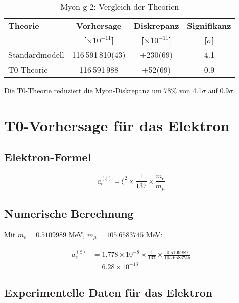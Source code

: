 \documentclass[12pt,a4paper]{article}
\newcommand{\xipar}{\xi}
\begin{document}
	\begin{table}[H]
		\centering
		\caption{Myon g-2: Vergleich der Theorien}
		\begin{tabular}{@{}lccc@{}}
			\toprule
			\textbf{Theorie} & \textbf{Vorhersage} & \textbf{Diskrepanz} & \textbf{Signifikanz} \\
			& \textbf{[$\times 10^{-11}$]} & \textbf{[$\times 10^{-11}$]} & \textbf{[$\sigma$]} \\
			\midrule
			Standardmodell & 116\,591\,810(43) & +230(69) & 4.1 \\
			\rowcolor{green!20}
			T0-Theorie & 116\,591\,988 & +52(69) & 0.9 \\
			\bottomrule
		\end{tabular}
	\end{table}
	
	\begin{erfolg}
		Die T0-Theorie reduziert die Myon-Diskrepanz um 78\% von 4.1$\sigma$ auf 0.9$\sigma$.
	\end{erfolg}
	
	\section{T0-Vorhersage für das Elektron}
	
	\subsection{Elektron-Formel}
	
	\begin{formel}
		\begin{equation}
			a_e^{(\xipar)} = \xipar^2 \times \frac{1}{137} \times \frac{m_e}{m_\mu}
		\end{equation}
	\end{formel}
	
	\subsection{Numerische Berechnung}
	
	Mit $m_e = 0.5109989$ MeV, $m_\mu = 105.6583745$ MeV:
	
	\begin{align}
		a_e^{(\xipar)} &= 1.778 \times 10^{-8} \times \frac{1}{137} \times \frac{0.5109989}{105.6583745} \\
		&= 6.28 \times 10^{-13}
	\end{align}
	
	\subsection{Experimentelle Daten für das Elektron}
	
\end{document}
